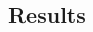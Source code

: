 \documentclass[11pt]{article}
\begin{document}
\begin{spacing}{1.3}





\section{Results}
\label{scn:results}


\end{spacing}
\end{document}
